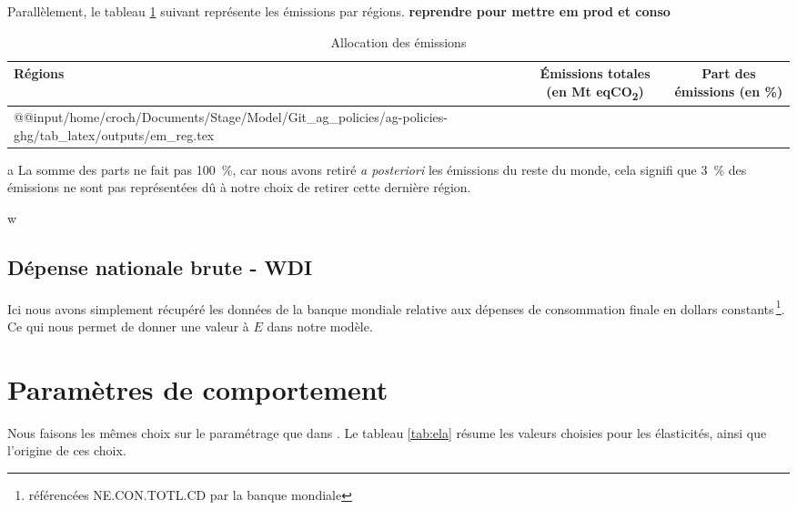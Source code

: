 Parallèlement, le tableau \ref{tab:em_reg} suivant représente les émissions par régions. \textbf{reprendre pour mettre em prod et conso}
\begin{table}[h]
    \centering
    \begin{threeparttable}
        \begin{tabularx}{\textwidth}{p{1.9in}cc}
            \textbf{Régions} & \textbf{Émissions totales} (en Mt eqCO\textsubscript{2}) & \textbf{Part des émissions}\tnote{a} (en \%) \\ \hline
            \csname @@input\endcsname /home/croch/Documents/Stage/Model/Git_ag_policies/ag-policies-ghg/tab_latex/outputs/em_reg.tex
            \hline
        \end{tabularx}
        \begin{tablenotes}
            \footnotesize
            \item[a] La somme des parts ne fait pas 100~\%, car nous avons retiré \textit{a posteriori} les émissions du reste du monde, cela signifi que 3~\% des émissions ne sont pas représentées dû à notre choix de retirer cette dernière région.
        \end{tablenotes}
        \caption{Allocation des émissions}
        \label{tab:em_reg}
    \end{threeparttable}
\end{table}
w

\subsection{Dépense nationale brute - WDI}

Ici nous avons simplement récupéré les données de la banque mondiale relative aux dépenses de consommation finale en dollars constants\,\footnote{référencées NE.CON.TOTL.CD par la banque mondiale}. Ce qui nous permet de donner une valeur à $E$ dans notre modèle.




\section{Paramètres de comportement}
Nous faisons les mêmes choix sur le paramétrage que dans \cite{Gouel2025}. Le tableau \ref{tab:ela} résume les valeurs choisies pour les élasticités, ainsi que l'origine de ces choix.

